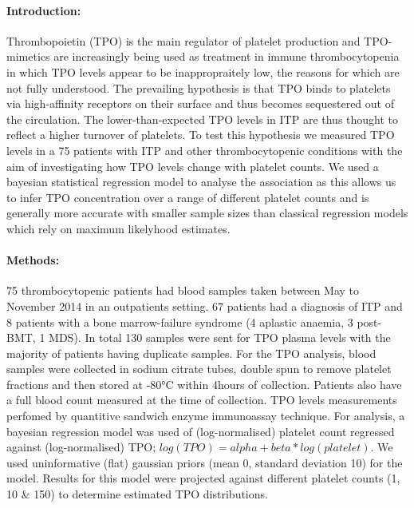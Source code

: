 \documentclass[11pt]{article}
\title{}
\author{George Adams .... Nichola Cooper}
\date{July 2018}
\begin{document}
\maketitle

\paragraph{Introduction:} Thrombopoietin (TPO) is the main regulator of platelet production and TPO-mimetics are increasingly being used as treatment in immune thrombocytopenia in which TPO levels appear to be inappropraitely low, the reasons for which are not fully understood. The prevailing hypothesis is that TPO binds to platelets via high-affinity receptors on their surface and thus becomes sequestered out of the circulation. The lower-than-expected TPO levels in ITP are thus thought to reflect a higher turnover of platelets. To test this hypothesis we measured TPO levels in a 75 patients with ITP and other thrombocytopenic conditions with the aim of investigating how TPO levels change with platelet counts. We used a bayesian statistical regression model to analyse the association as this allows us to infer TPO concentration over a range of different platelet counts and is generally more accurate with smaller sample sizes than classical regression models which rely on maximum likelyhood estimates.


\paragraph{Methods:} 75 thrombocytopenic patients had blood samples taken between May to November 2014 in an outpatients setting. 67 patients had a diagnosis of ITP and 8 patients with a bone marrow-failure syndrome (4 aplastic anaemia, 3 post- BMT, 1 MDS). In total 130 samples were sent for TPO plasma levels with the majority of patients having duplicate samples. For the TPO analysis, blood samples were collected in sodium citrate tubes, double spun to remove platelet fractions and then stored at -80°C within 4hours of collection. Patients also have a full blood count measured at the time of collection. TPO levels measurements perfomed by quantitive sandwich enzyme immunoassay technique. For analysis, a bayesian regression model was used of (log-normalised) platelet count regressed against (log-normalised) TPO; $log(TPO) = alpha + beta*log(platelet)$. We used uninformative (flat) gaussian priors (mean 0, standard deviation 10) for the model. Results for this model were projected against different platelet counts (1, 10 & 150) to determine estimated TPO distributions.
\end{document}
